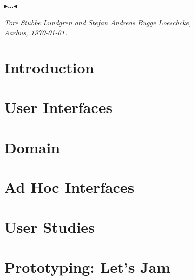\documentclass[oneside,11pt,openright]{report}
\newcommand{\todo}[1]{{\color[rgb]{.5,0,0}\textbf{$\blacktriangleright$#1$\blacktriangleleft$}}}
\begin{document}
{\todo{\dots}

\vspace{2ex}
\begin{flushright}
  \emph{Tore Stubbe Lundgren and Stefan Andreas Bugge Loeschcke,}\\
  \emph{Aarhus, \today.}
\end{flushright}

\tableofcontents
{}
\setcounter{secnumdepth}{2}




\listoffigures

\chapter{Introduction}
\label{ch:intro}


\chapter{User Interfaces}
\label{ch:ui}


\chapter{Domain}
\label{ch:domain}


\chapter{Ad Hoc Interfaces}
\label{ch:adhoc}


\chapter{User Studies}
\label{ch:workshops}


\chapter{Prototyping: Let's Jam}
\label{ch:jamming}


}
\end{document}
